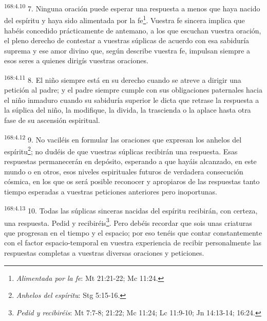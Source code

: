 \par
\textsuperscript{168:4.10} 7. Ninguna oración puede esperar una respuesta a menos que haya nacido del espíritu y haya sido alimentada por la fe\footnote{\textit{Alimentada por la fe}: Mt 21:21-22; Mc 11:24.}. Vuestra fe sincera implica que habéis concedido prácticamente de antemano, a los que escuchan vuestra oración, el pleno derecho de contestar a vuestras súplicas de acuerdo con esa sabiduría suprema y ese amor divino que, según describe vuestra fe, impulsan siempre a esos seres a quienes dirigís vuestras oraciones.

\par
\textsuperscript{168:4.11} 8. El niño siempre está en su derecho cuando se atreve a dirigir una petición al padre; y el padre siempre cumple con sus obligaciones paternales hacia el niño inmaduro cuando su sabiduría superior le dicta que retrase la respuesta a la súplica del niño, la modifique, la divida, la trascienda o la aplace hasta otra fase de su ascensión espiritual.

\par
\textsuperscript{168:4.12} 9. No vaciléis en formular las oraciones que expresan los anhelos del espíritu\footnote{\textit{Anhelos del espíritu}: Stg 5:15-16.}; no dudéis de que vuestras súplicas recibirán una respuesta. Esas respuestas permanecerán en depósito, esperando a que hayáis alcanzado, en este mundo o en otros, esos niveles espirituales futuros de verdadera consecución cósmica, en los que os será posible reconocer y apropiaros de las respuestas tanto tiempo esperadas a vuestras peticiones anteriores pero inoportunas.

\par
\textsuperscript{168:4.13} 10. Todas las súplicas sinceras nacidas del espíritu recibirán, con certeza, una respuesta. Pedid y recibiréis\footnote{\textit{Pedid y recibiréis}: Mt 7:7-8; 21:22; Mc 11:24; Lc 11:9-10; Jn 14:13-14; 16:24.}. Pero debéis recordar que sois unas criaturas que progresan en el tiempo y el espacio; por eso tenéis que contar constantemente con el factor espacio-temporal en vuestra experiencia de recibir personalmente las respuestas completas a vuestras diversas oraciones y peticiones.

